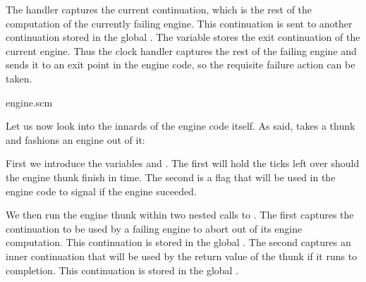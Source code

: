 The handler captures the current continuation, which is
the rest of the computation of the currently failing
engine.  This continuation is sent to another
continuation stored in the global .
The  variable stores the exit
continuation of the current engine.  Thus the clock
handler captures the rest of the failing engine and
sends it to an exit point in the engine code, so the
requisite failure action can be taken.

\scmfilename engine.scm


Let us now look into the innards of the engine code
itself.  As said,  takes a thunk and
fashions an engine out of it:


\n First we introduce the variables 
and .  The first will hold
the ticks left over should the engine thunk finish
in time.  The second is a flag that will be used in
the engine code to signal if the engine suceeded.

We then run the engine thunk within two nested calls to
.  The first  captures the
continuation to be used by a failing engine to abort
out of its engine computation.  This continuation is
stored in the global .  The second
 captures an inner continuation that 
will be used by the return value of the thunk  if
it runs to completion.  This continuation is stored
in the global
.

